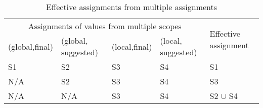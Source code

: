 \begin{table}[t]
\centering
\caption{Effective assignments from multiple assignments}
\label{my-label}
\begin{tabular}{|l|l|l|l|l|}
\hline
\multicolumn{4}{|c|}{Assignments of values from multiple scopes}   & \multirow{2}{*}{Effective assignment} \\ \cline{1-4}
(global,final) & (global, suggested) & (local,final) & (local, suggested) &                                   \\ \hline
S1             & S2                  & S3            & S4                 & S1                                \\ \hline
N/A            & S2                  & S3            & S4                 & S3                                \\ \hline
N/A            & N/A                 & S3            & S4                 & S2 $\cup$ S4                             \\ \hline
\end{tabular}
\end{table}